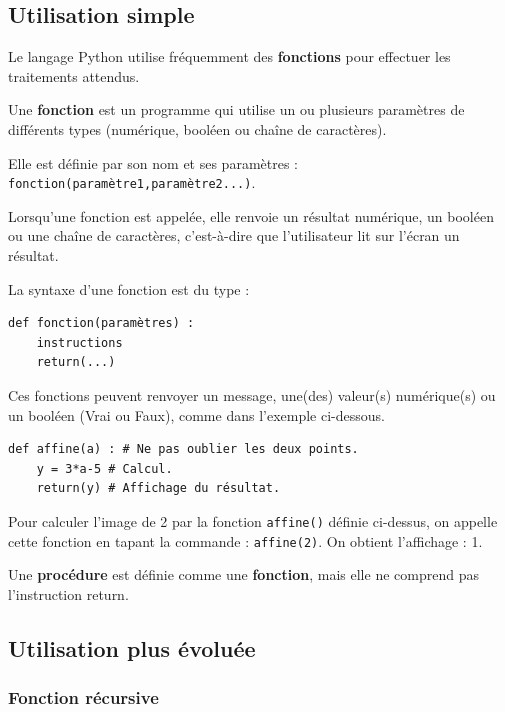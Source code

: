 \subsection{Utilisation simple}

Le langage Python utilise fréquemment des \textbf{fonctions} pour effectuer les traitements attendus.

Une \textbf{fonction} est un programme qui utilise un ou plusieurs paramètres de différents types (numérique,
booléen ou chaîne de caractères).

Elle est définie par son nom et ses paramètres : \verb!fonction(paramètre1,paramètre2...)!.

Lorsqu'une fonction est appelée, elle renvoie un résultat numérique, un booléen ou une chaîne de caractères,
c'est-à-dire que l'utilisateur lit sur l'écran un résultat.

La syntaxe d'une fonction est du type :

\begin{lstlisting}
def fonction(paramètres) :
	instructions
	return(...)
\end{lstlisting}

Ces fonctions peuvent renvoyer un message, une(des) valeur(s) numérique(s) ou un booléen (Vrai ou
Faux), comme dans l'exemple ci-dessous.

\begin{lstlisting}
def affine(a) : # Ne pas oublier les deux points.
	y = 3*a-5 # Calcul.
	return(y) # Affichage du résultat.

\end{lstlisting}

Pour calculer l'image de 2 par la fonction \verb!affine()! définie ci-dessus, on appelle cette fonction en tapant
la commande : \verb!affine(2)!. On obtient l'affichage : 1.

\medskip

\begin{Rmq}[]
Une \textbf{procédure} est définie comme une \textbf{fonction},
mais elle ne comprend pas l'instruction return.
\end{Rmq}

\subsection{Utilisation plus évoluée}
\subsubsection{Fonction récursive}

